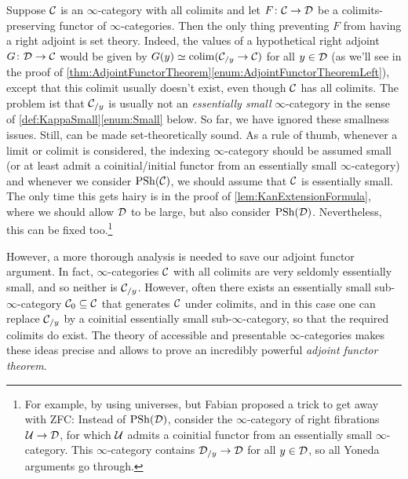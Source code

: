 \newpage


Suppose $\mathcal{C}$ is an $\infty$-category with all colimits and let $F\colon \mathcal{C}\rightarrow\mathcal{D}$ be a colimits-preserving functor of $\infty$-categories. Then the only thing preventing $F$ from having a right adjoint is set theory. Indeed, the values of a hypothetical right adjoint $G\colon \mathcal{D}\rightarrow\mathcal{C}$ would be given by $G(y)\simeq \operatorname*{colim}(\mathcal{C}_{/y}\rightarrow \mathcal{C})$ for all $y\in\mathcal{D}$ (as we'll see in the proof of \cref{thm:AdjointFunctorTheorem}\cref{enum:AdjointFunctorTheoremLeft}), except that this colimit usually doesn't exist, even though $\mathcal{C}$ has all colimits. The problem ist that $\mathcal{C}_{/y}$ is usually not an \emph{essentially small} $\infty$-category in the sense of \cref{def:KappaSmall}\cref{enum:Small} below. So far, we have ignored these smallness issues. Still,  can be made set-theoretically sound. As a rule of thumb, whenever a limit or colimit is considered, the indexing $\infty$-category should be assumed small (or at least admit a coinitial/initial functor from an essentially small $\infty$-category) and whenever we consider $\operatorname{PSh}(\mathcal{C})$, we should assume that $\mathcal{C}$ is essentially small. The only time this gets hairy is in the proof of \cref{lem:KanExtensionFormula}, where we should allow $\mathcal{D}$ to be large, but also consider $\operatorname{PSh}(\mathcal{D})$. Nevertheless, this can be fixed too.\footnote{For example, by using universes, but Fabian proposed a trick to get away with ZFC: Instead of $\operatorname{PSh}(\mathcal{D})$, consider the $\infty$-category of right fibrations $\mathcal{U}\rightarrow \mathcal{D}$, for which $\mathcal{U}$ admits a coinitial functor from an essentially small $\infty$-category. This $\infty$-category contains $\mathcal{D}_{/y}\rightarrow\mathcal{D}$ for all $y\in \mathcal{D}$, so all Yoneda arguments go through.}

However, a more thorough analysis is needed to save our adjoint functor argument. In fact, $\infty$-categories $\mathcal{C}$ with all colimits are very seldomly essentially small, and so neither is $\mathcal{C}_{/y}$. However, often there exists an essentially small sub-$\infty$-category $\mathcal{C}_0\subseteq\mathcal{C}$ that generates $\mathcal{C}$ under colimits, and in this case one can replace $\mathcal{C}_{/y}$ by a coinitial essentially small sub-$\infty$-category, so that the required colimits do exist. The theory of accessible and presentable $\infty$-categories makes these ideas precise and allows to prove an incredibly powerful \emph{adjoint functor theorem}.

